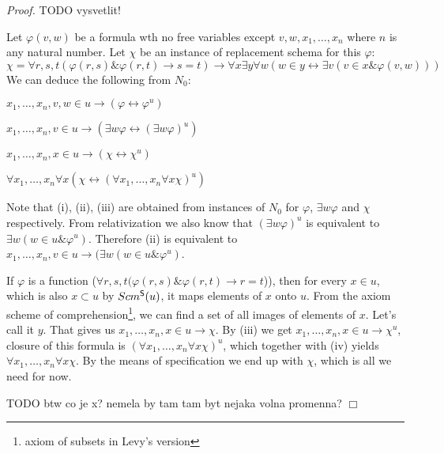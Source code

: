 \documentclass[12pt,a4paper]{article}
\newenvironment{proof}
{\noindent \textit{Proof.}}
{\hspace*{\fill} $\Box$}
\renewcommand{\iff}{\leftrightarrow}
\newcommand{\then}{\rightarrow}
\newcommand{\bce}{\begin{compactenum}}
\newcommand{\ece}{\end{compactenum}}
\begin{document}
\begin{proof}
TODO vysvetlit!


Let $\varphi(v, w)$ be a formula wth no free variables except $v, w, x_1, \ldots, x_n$ where $n$ is any natural number.
Let $\chi$ be an instance of replacement schema for this $\varphi$:
\begin{equation}
\chi = \forall r, s, t(\varphi(r, s) \& \varphi(r, t) \then s = t) \then \forall x \exists y \forall w (w \in y \iff \exists v (v \in x \& \varphi(v, w)))
\end{equation}
\medskip
We can deduce the following from $N_0$: 
\bce[(i)]
\item $x_1, \ldots, x_n, v, w \in u \then (\varphi \iff \varphi^{u}) $
\item $x_1, \ldots, x_n, v \in u \then (\exists w \varphi \iff (\exists w \varphi)^{u})$
\item $x_1, \ldots, x_n, x \in u \then (\chi \iff \chi^{u})$
\item $\forall x_1, \ldots, x_n \forall x (\chi \iff (\forall x_1, \ldots, x_n \forall x \chi)^{u})$
\ece

Note that (i), (ii), (iii) are obtained from instances of $N_0$ for $\varphi$, $\exists w \varphi$ and $\chi$ respectively.  %
From relativization we also know that $(\exists w \varphi)^{u}$ is equivalent to $\exists w (w \in u \& \varphi^{u})$.
Therefore (ii) is equivalent to $x_1, \ldots, x_n, v \in u \then (\exists w (w \in u \& \varphi^{u})$. 

If $\varphi$ is a function ($ \forall r, s, t(\varphi(r, s) \& \varphi(r, t) \then r=t $)), then for every $x \in u$, which is also $x \subset u$ by $Scm^{\sf{S}}(u)$,
it maps elements of $x$ onto $u$. From the axiom scheme of comprehension\footnote{axiom of subsets in Levy's version}, we can find a set of all images of elements of $x$. Let's call it $y$.
That gives us $x_1, \ldots, x_n, x \in u \then \chi$. By (iii) we get $x_1, \ldots, x_n, x \in u \then \chi^{u}$, closure of this formula is $(\forall x_1, \ldots, x_n \forall x \chi)^{u}$, 
which together with (iv) yields $\forall x_1, \ldots, x_n \forall x \chi$. By the means of specification we end up with $\chi$, which is all we need for now. 


TODO btw co je x? nemela by tam tam byt nejaka volna promenna?
\end{proof}


\end{document}
